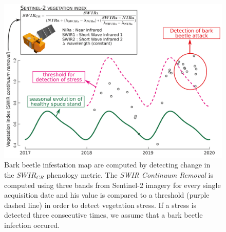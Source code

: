 \documentclass[3p,times]{elsarticle}
\begin{document}
\begin{figure}
	\centering
	\includegraphics[width=\textwidth]{fctHarmo.png}
	\caption{Bark beetle infestation map are computed by detecting change in the $SWIR_{CR}$ phenology metric. The \textit{SWIR Continuum Removal} is computed using three bands from Sentinel-2 imagery for every single acquisition date and his value is compared to a threshold (purple dashed line) in order to detect vegetation stress. If a stress is detected three consecutive times, we assume that a bark beetle infection occured.}
	\label{fig:harmo}
\end{figure}
\end{document}
